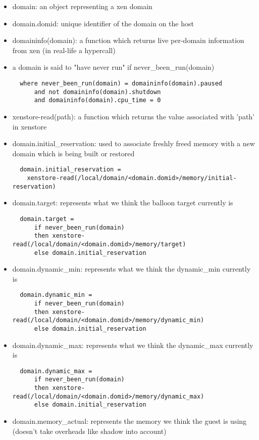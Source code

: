 \begin{itemize}
\item domain: an object representing a xen domain
\item domain.domid: unique identifier of the domain on the host
\item domaininfo(domain): a function which returns live per-domain information from xen (in real-life a hypercall)
\item a domain is said to "have never run" if never\_been\_run(domain)
\begin{verbatim}
  where never_been_run(domain) = domaininfo(domain).paused 
      and not domaininfo(domain).shutdown 
      and domaininfo(domain).cpu_time = 0
\end{verbatim}
\item xenstore-read(path): a function which returns the value associated with 'path' in xenstore
\item domain.initial\_reservation: used to associate freshly freed memory with a new domain which is being built or restored
\begin{verbatim}
  domain.initial_reservation = 
    xenstore-read(/local/domain/<domain.domid>/memory/initial-reservation)
\end{verbatim}
\item domain.target: represents what we think the balloon target currently is
\begin{verbatim}
  domain.target = 
      if never_been_run(domain)
      then xenstore-read(/local/domain/<domain.domid>/memory/target)
      else domain.initial_reservation
\end{verbatim}
\item domain.dynamic\_min: represents what we think the dynamic\_min currently is 
\begin{verbatim}
  domain.dynamic_min = 
      if never_been_run(domain)
      then xenstore-read(/local/domain/<domain.domid>/memory/dynamic_min)
      else domain.initial_reservation
\end{verbatim}
\item domain.dynamic\_max: represents what we think the dynamic\_max currently is
\begin{verbatim}
  domain.dynamic_max = 
      if never_been_run(domain)
      then xenstore-read(/local/domain/<domain.domid>/memory/dynamic_max)
      else domain.initial_reservation
\end{verbatim}
\item domain.memory\_actual: represents the memory we think the guest is using (doesn't take overheads like shadow into account)

\end{itemize}

